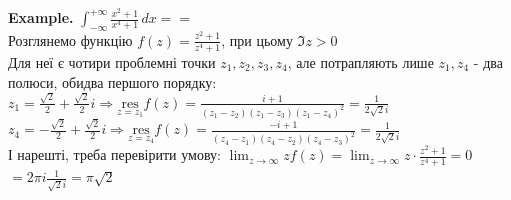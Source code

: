 \documentclass[a4paper, 10pt]{article}
\def\residue#1#2{\underset{z = {#1}}{\textrm{res}} {#2}}
\def\hugespace{\vspace{5mm} \\}
\theoremstyle{theoremdd}
\theoremstyle{theoremdd}
\theoremstyle{theoremdd}
\theoremstyle{theoremdd}
\theoremstyle{theoremdd}
\theoremstyle{theoremdd}
\theoremstyle{theoremdd}
\theoremstyle{theoremdd}
\begin{document}
\textbf{Example.} $\displaystyle \int_{-\infty}^{+\infty} \frac{x^2+1}{x^4+1}\,dx = \boxed{=}$\\
Розглянемо функцію $\displaystyle f(z) = \frac{z^2+1}{z^4+1}$, при цьому $\Im z > 0$\\
Для неї є чотири проблемні точки $z_1, z_2, z_3, z_4$, але потрапляють лише $z_1, z_4$ - два полюси, обидва першого порядку:\\
$\displaystyle z_1 = \frac{\sqrt{2}}{2} + \frac{\sqrt{2}}{2} i \Rightarrow \residue{z_1}{f(z)} = \frac{i+1}{(z_1-z_2)(z_1-z_3)(z_1-z_4)^2} = \frac{1}{2 \sqrt{2} i}$\\
$\displaystyle z_4 = -\frac{\sqrt{2}}{2} + \frac{\sqrt{2}}{2} i \Rightarrow \residue{z_4}{f(z)} = \frac{-i+1}{(z_4-z_1)(z_4-z_2)(z_4-z_3)^2} = \frac{1}{2 \sqrt{2} i}$\\
І нарешті, треба перевірити умову: $\displaystyle \lim_{z \to \infty} z f(z) = \lim_{z \to \infty} z \cdot \frac{z^2+1}{z^4+1} = 0$\\
$\displaystyle \boxed{=} 2 \pi i \frac{1}{\sqrt{2} i } = \pi \sqrt{2}$
\hugespace
\end{document}
